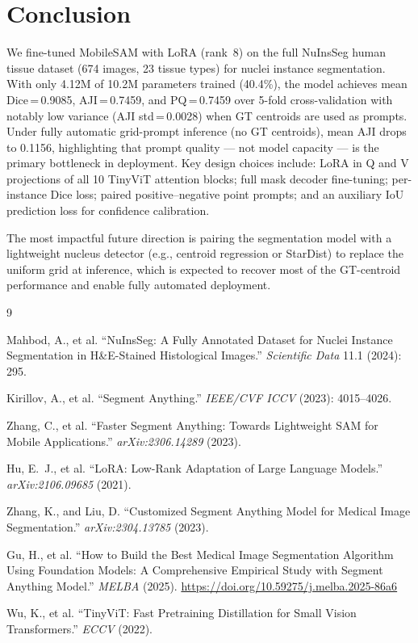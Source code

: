 \documentclass[10pt,twocolumn]{article}
\begin{document}
\section{Conclusion}

We fine-tuned MobileSAM with LoRA (rank~8) on the full NuInsSeg
human tissue dataset (674 images, 23 tissue types) for nuclei
instance segmentation. With only 4.12M of 10.2M parameters
trained (40.4\%), the model achieves mean Dice\,=\,0.9085,
AJI\,=\,0.7459, and PQ\,=\,0.7459 over 5-fold cross-validation
with notably low variance (AJI std\,=\,0.0028) when GT centroids
are used as prompts. Under fully automatic grid-prompt inference
(no GT centroids), mean AJI drops to 0.1156, highlighting that
prompt quality --- not model capacity --- is the primary bottleneck
in deployment. Key design choices include: LoRA in Q and V
projections of all 10 TinyViT attention blocks; full mask decoder
fine-tuning; per-instance Dice loss; paired positive--negative
point prompts; and an auxiliary IoU prediction loss for confidence
calibration.

The most impactful future direction is pairing the segmentation
model with a lightweight nucleus detector (e.g., centroid
regression or StarDist) to replace the uniform grid at inference,
which is expected to recover most of the GT-centroid performance
and enable fully automated deployment.

\begin{thebibliography}{9}

Mahbod, A., et al. ``NuInsSeg: A Fully Annotated Dataset for
Nuclei Instance Segmentation in H\&E-Stained Histological Images.''
\textit{Scientific Data} 11.1 (2024): 295.

Kirillov, A., et al. ``Segment Anything.''
\textit{IEEE/CVF ICCV} (2023): 4015--4026.

Zhang, C., et al. ``Faster Segment Anything: Towards Lightweight SAM for
Mobile Applications.'' \textit{arXiv:2306.14289} (2023).

Hu, E.~J., et al. ``LoRA: Low-Rank Adaptation of Large Language Models.''
\textit{arXiv:2106.09685} (2021).

Zhang, K., and Liu, D. ``Customized Segment Anything Model for
Medical Image Segmentation.'' \textit{arXiv:2304.13785} (2023).

Gu, H., et al. ``How to Build the Best Medical Image Segmentation
Algorithm Using Foundation Models: A Comprehensive Empirical Study
with Segment Anything Model.''
\textit{MELBA} (2025). \url{https://doi.org/10.59275/j.melba.2025-86a6}

Wu, K., et al. ``TinyViT: Fast Pretraining Distillation for Small
Vision Transformers.'' \textit{ECCV} (2022).

\end{thebibliography}
\end{document}
